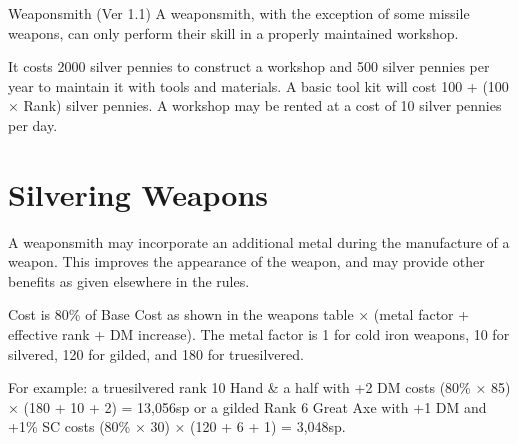 \begin{Chapter}{Weaponsmith (Ver 1.1)}
A weaponsmith, with the exception of some missile weapons, can only
perform their skill in a properly maintained workshop.

It costs 2000 silver pennies to construct a workshop and 500 silver
pennies per year to maintain it with tools and materials. A basic tool
kit will cost 100 + (100 × Rank) silver pennies.  A workshop may be
rented at a cost of 10 silver pennies per day.

\section{Silvering Weapons}

A weaponsmith may incorporate an additional metal during the
manufacture of a weapon.  This improves the appearance of the weapon,
and may provide other benefits as given elsewhere in the rules.

Cost is 80\% of Base Cost as shown in the weapons table × (metal
factor + effective rank + DM increase).  The metal factor is 1 for
cold iron weapons, 10 for silvered, 120 for gilded, and 180 for
truesilvered.

For example: a truesilvered rank 10 Hand \& a half with +2 DM costs
(80\% × 85) × (180 + 10 + 2) = 13,056sp or a gilded Rank 6 Great Axe
with +1 DM and +1\% SC costs (80\% × 30) × (120 + 6 + 1) = 3,048sp.

\end{Chapter}
